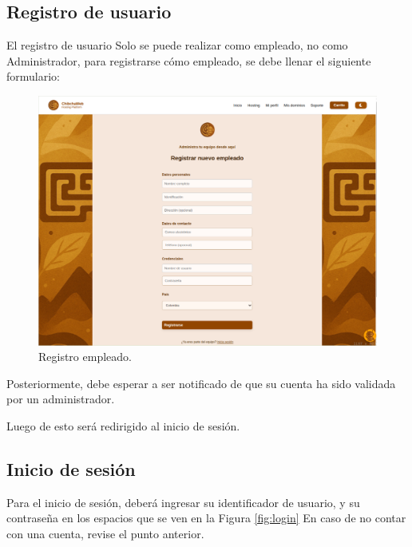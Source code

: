 \subsection{Registro de usuario }
El registro de usuario Solo se puede realizar como empleado, no como Administrador, para registrarse cómo empleado, se debe llenar el siguiente formulario:

\begin{figure}[H]
    \includegraphics[width=\columnwidth]{acceso/registro-empleado.png}
    \caption{Registro empleado.}
    \label{fig:registro-empleado}
\end{figure}

Posteriormente, debe esperar a ser notificado de que su cuenta ha sido validada por un administrador.

Luego de esto será redirigido al inicio de sesión.

\subsection{Inicio de sesión}
Para el inicio de sesión, deberá ingresar su identificador de usuario, y su contraseña en los espacios que se ven en la Figura \ref{fig:login} En caso de no contar con una cuenta, revise el punto anterior.

